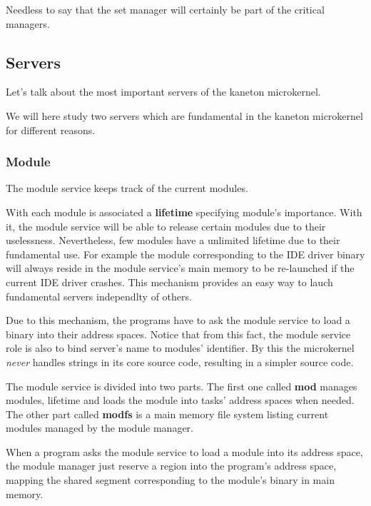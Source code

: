 \begin{multicols}{2}
Needless to say that the set manager will certainly be part of the critical
managers.

%
%

\subsection{Servers}

Let's talk about the most important servers of the kaneton microkernel.

We will here study two servers which are fundamental in the kaneton
microkernel for different reasons.

%
%

\subsubsection{Module}

The module service keeps track of the current modules.

With each module is associated a \textbf{lifetime} specifying module's
importance. With it, the module service will be able to release certain
modules due to their uselessness. Nevertheless, few modules have a
unlimited lifetime due to their fundamental use. For example the module
corresponding to the IDE driver binary will always reside in the module
service's main memory to be re-launched if the current IDE driver crashes.
This mechanism provides an easy way to lauch fundamental servers independlty
of others.

Due to this mechanism, the programs have to ask the module service to load
a binary into their address spaces. Notice that from this fact, the module
service role is also to bind server's name to modules' identifier. By this
the microkernel \textit{never} handles strings in its core source code,
resulting in a simpler source code.

The module service is divided into two parts. The first one called \textbf{mod}
manages modules, lifetime and loads the module into tasks' address spaces
when needed. The other part called \textbf{modfs} is a main memory file
system listing current modules managed by the module manager.

When a program asks the module service to load a module into its address
space, the module manager just reserve a region into the program's address
space, mapping the shared segment corresponding to the module's binary in
main memory.

%
%


\end{multicols}
